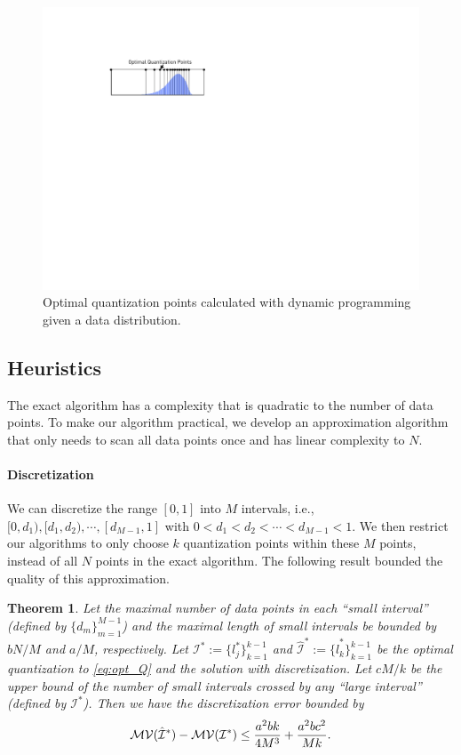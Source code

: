 \documentclass{article}
\newtheorem{theorem}{Theorem}
\begin{document}
\begin{figure}[t]
\centering    
\includegraphics[width=0.5\columnwidth]{micro-experiments/dp-level.pdf} 
\caption{Optimal quantization points calculated with
dynamic programming given a data distribution. }
\label{fig:optimalquantization}
\end{figure} 

\subsection{Heuristics}

The exact algorithm has a complexity that is quadratic to the number of data points. To make our algorithm practical,
we develop an approximation algorithm that only needs to scan all data points once and has linear complexity to $N$.

\paragraph*{Discretization}

We can discretize the range $[0,1]$ into $M$ intervals, i.e., $[0,d_1), [d_1, d_2), \cdots, [d_{M-1}, 1]$ with $0< d_1<d_2<\cdots < d_{M-1}<1$. We then restrict our algorithms to only choose $k$ quantization points within these $M$ points, instead of all $N$ points in the exact algorithm. The following result bounded the quality of this approximation.

\begin{theorem} \label{thm:optQ}
Let the maximal number of data points in each ``small interval'' (defined by $\{d_m\}_{m=1}^{M-1}$) and the maximal length of small intervals be bounded by $bN/M$ and $a/M$, respectively. Let ${\mathcal{I}^*} := \{l^*_j\}_{k=1}^{k-1}$ and $\hat{\mathcal{I}}^* :=\{\hat{l}^*_k\}_{k=1}^{k-1}$ be the optimal quantization to \eqref{eq:opt_Q} and the solution with discretization. Let $cM/k$ be the upper bound of the number of small intervals crossed by any ``large interval'' (defined by ${\mathcal{I}}^*$). Then we have the discretization error bounded by
\[
 \mathcal{MV}(\hat{\mathcal{I}}^*) -  \mathcal{MV}({\mathcal{I}}^*) \leq {a^2b k \over 4 M^3} + {a^2bc^2 \over Mk}.
\]
\end{theorem}
\end{document}

